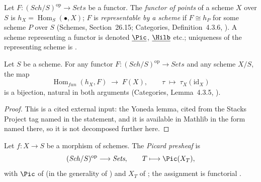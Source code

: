 \begin{definition}\label{def:pc-representable-functor}
Let $F:(\mathit{Sch}/S)^{\mathrm{op}}\to\textit{Sets}$ be a functor.  The
\emph{functor of points} of a scheme $X$ over $S$ is
$h_X=\operatorname{Hom}_S(\bullet,X)$; $F$ is \emph{representable by a
scheme} if $F\cong h_P$ for some scheme $P$ over $S$
(Schemes, Section~26.15; Categories, Definition~4.3.6,
).  A scheme
representing a functor is denoted $\underline{\Pic}$,
$\underline{\Hilb}$ etc.; uniqueness of the representing scheme is
.
\mathlibok\ 
\end{definition}

\begin{lemma}[Yoneda]\label{lem:pc-yoneda}
Let $S$ be a scheme.  For any functor
$F:(\mathit{Sch}/S)^{\mathrm{op}}\to\textit{Sets}$ and any scheme $X/S$,
the map
\[
\operatorname{Hom}_{\textit{fun}}(h_X,F)\;\longrightarrow\;F(X),\qquad
\tau\;\longmapsto\;\tau_X(\mathrm{id}_X)
\]
is a bijection, natural in both arguments (Categories, Lemma~4.3.5,
).
\mathlibok\ 
\end{lemma}
\begin{proof}
This is a cited external input: the Yoneda lemma, cited from the Stacks
Project tag named in the statement, and it is available in Mathlib in the
form named there, so it is not decomposed further here.
\end{proof}

\begin{definition}\label{def:pc-picard-presheaf}
Let $f:X\to S$ be a morphism of schemes.  The \emph{Picard presheaf} is
\[
(\mathit{Sch}/S)^{\mathrm{op}}\longrightarrow\textit{Sets},\qquad
T\longmapsto\Pic(X_T),
\]
with $\Pic$ of  (in the generality of
) and $X_T$ of ; the
assignment is functorial .
\leanok
\end{definition}

